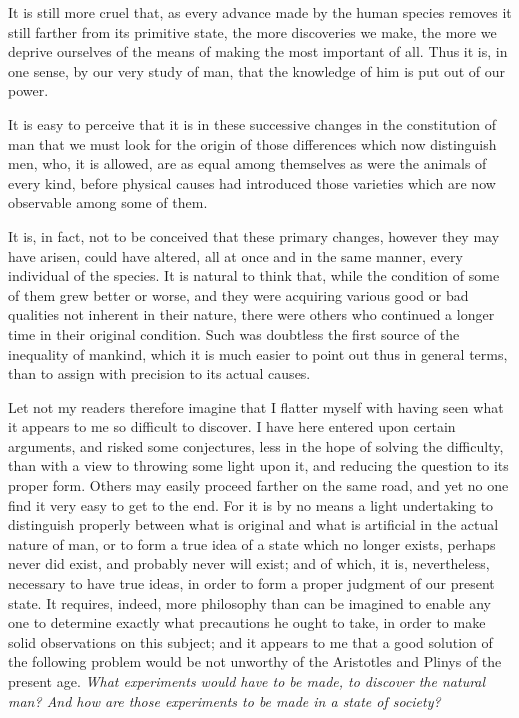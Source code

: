 \documentclass[12pt]{report}
\begin{document}
It is still more cruel that, as every advance made by the human species removes it still farther from its primitive state, the more discoveries we make, the more we deprive ourselves of the means of making the most important of all. Thus it is, in one sense, by our very study of man, that the knowledge of him is put out of our power.

It is easy to perceive that it is in these successive changes in the constitution of man that we must look for the origin of those differences which now distinguish men, who, it is allowed, are as equal among themselves as were the animals of every kind, before physical causes had introduced those varieties which are now observable among some of them.

It is, in fact, not to be conceived that these primary changes, however they may have arisen, could have altered, all at once and in the same manner, every individual of the species. It is natural to think that, while the condition of some of them grew better or worse, and they were acquiring various good or bad qualities not inherent in their nature, there were others who continued a longer time in their original condition. Such was doubtless the first source of the inequality of mankind, which it is much easier to point out thus in general terms, than to assign with precision to its actual causes.

Let not my readers therefore imagine that I flatter myself with having seen what it appears to me so difficult to discover. I have here entered upon certain arguments, and risked some conjectures, less in the hope of solving the difficulty, than with a view to throwing some light upon it, and reducing the question to its proper form. Others may easily proceed farther on the same road, and yet no one find it very easy to get to the end. For it is by no means a light undertaking to distinguish properly between what is original and what is artificial in the actual nature of man, or to form a true idea of a state which no longer exists, perhaps never did exist, and probably never will exist; and of which, it is, nevertheless, necessary to have true ideas, in order to form a proper judgment of our present state. It requires, indeed, more philosophy than can be imagined to enable any one to determine exactly what precautions he ought to take, in order to make solid observations on this subject; and it appears to me that a good solution of the following problem would be not unworthy of the Aristotles and Plinys of the present age. \textit{What experiments would have to be made, to discover the natural man? And how are those experiments to be made in a state of society?}
\end{document}
